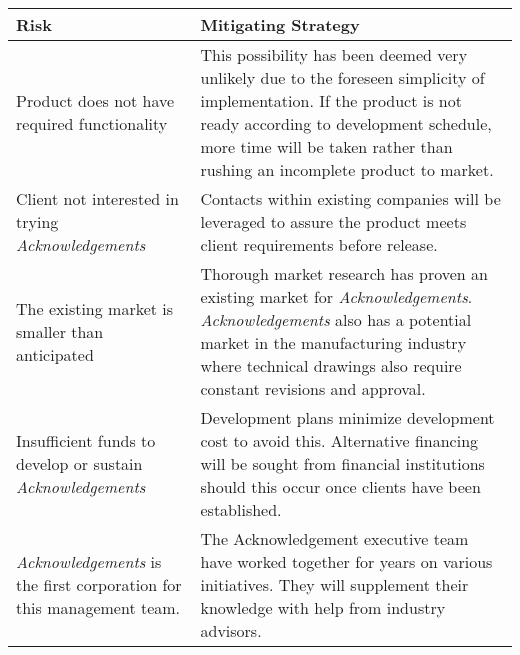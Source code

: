 \begin{center} \begin{tabular}{| p{2in} | p{3.6in} | }
    \hline
    {\bf Risk} & {\bf Mitigating Strategy} \\ \hline
	
	{Product does not have required functionality} & 
	{This possibility has been deemed very unlikely due to the foreseen simplicity of implementation. If the product is not ready according to development schedule, more time will be taken rather than rushing an incomplete product to market.} \\ \hline
	
	{\raggedright Client not interested in trying {\it Acknowledgements}} & 
	{Contacts within existing companies will be leveraged to assure the product meets client requirements before release.} \\ \hline
	
	{The existing market is smaller than anticipated} & 
	{Thorough market research has proven an existing market for {\it Acknowledgements}. {\it Acknowledgements} also has a potential market in the manufacturing industry where technical drawings also require constant revisions and approval.} \\ \hline
	
	{Insufficient funds to develop or sustain {\it Acknowledgements}} & 
	{Development plans minimize development cost to avoid this. Alternative financing will be sought from financial institutions should this occur once clients have been established.} \\ \hline

	{{\it Acknowledgements} is the first corporation for this management team.} & 
	{The Acknowledgement executive team have worked together for years on various initiatives. They will supplement their knowledge with help from industry advisors.} \\ \hline
\end{tabular} \end{center}